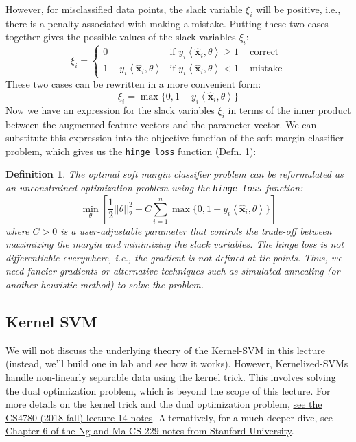 \documentclass{article}[11pt]
\newtheorem{defn}{Definition}
\newcommand{\norm}[1]{\left|\left|#1\right|\right|}
\begin{document}
However, for misclassified data points, the slack variable $\xi_{i}$ will be positive, i.e., there is a penalty associated with making a mistake. 
Putting these two cases together gives the possible values of the slack variables $\xi_{i}$:
\begin{equation*}
    \xi_{i} = \begin{cases}
        0 & \text{if $y_{i}\left<\hat{\mathbf{x}}_{i},\theta\right> \geq 1$}\,\quad\text{correct}\\
        1 - y_{i}\left<\hat{\mathbf{x}}_{i},\theta\right> & \text{if $y_{i}\left<\hat{\mathbf{x}}_{i},\theta\right> < 1$}\,\quad\text{mistake}
    \end{cases}
\end{equation*}
These two cases can be rewritten in a more convenient form:
\begin{equation*}
    \xi_{i} = \max\{0, 1 - y_{i}\left<\hat{\mathbf{x}}_{i},\theta\right>\}
\end{equation*}
Now we have an expression for the slack variables $\xi_{i}$ in terms of the inner product between the augmented feature vectors and the parameter vector.
We can substitute this expression into the objective function of the soft margin classifier problem, which gives us the \texttt{hinge loss} function (Defn. \ref{defn:hinge-loss}):
\begin{mdframed}
\begin{defn}\label{defn:hinge-loss}
The optimal soft margin classifier problem can be reformulated as an unconstrained optimization problem using the \texttt{hinge loss} function:
\begin{equation*}
    \min_{\theta}\left[\frac{1}{2}\norm{\theta}_{2}^{2} + C\sum_{i=1}^{n}\max\{0, 1 - y_{i}\left<\hat{\mathbf{x}}_{i},\theta\right>\}\right]
\end{equation*}
where $C>{0}$ is a user-adjustable parameter that controls the trade-off between maximizing the margin and minimizing the slack variables.
The hinge loss is not differentiable everywhere, i.e., the gradient is not defined at tie points. 
Thus, we need fancier gradients or alternative techniques such as simulated annealing (or another heuristic method) to solve the problem. 
\end{defn}
\end{mdframed}

\subsection{Kernel SVM}
We will not discuss the underlying theory of the Kernel-SVM in this lecture (instead, we'll build one in lab and see how it works).
However, Kernelized-SVMs handle non-linearly separable data using the kernel trick.
This involves solving the dual optimization problem, which is beyond the scope of this lecture.
For more details on the kernel trick and the dual optimization problem, \href{https://www.cs.cornell.edu/courses/cs4780/2018fa/lectures/lecturenote14.html}{see the CS4780 (2018 fall) lecture 14 notes}. Alternatively, for a much deeper dive, see \href{https://cornell.box.com/s/o2y06fjcjcdsgvqejo434gizc5933qpy}{Chapter 6 of the Ng and Ma CS 229 notes from Stanford University}.
\end{document}

